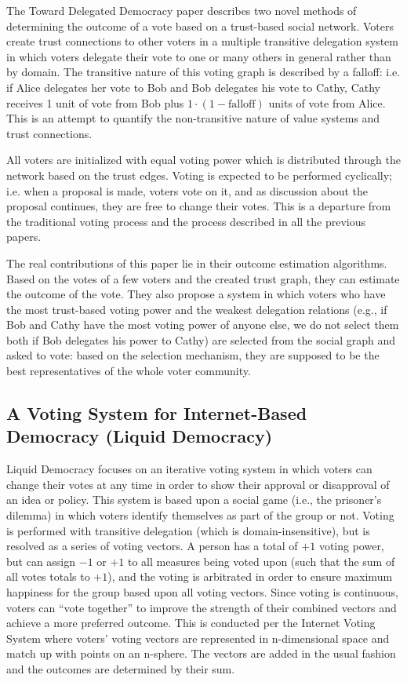 \documentclass[a4paper]{acm_proc_article-sp}
\begin{document}
The Toward Delegated Democracy paper describes two novel methods of determining the outcome of a vote based on a trust-based
social network.  Voters create trust connections to other voters in a multiple transitive delegation system in which voters
delegate their vote to one or many others in general rather than by domain.  The transitive nature of this voting graph is
described by a falloff: i.e. if Alice delegates her vote to Bob and Bob delegates his vote to Cathy, Cathy receives 1 unit of
vote from Bob plus $1 \cdot (1-\mathrm{falloff})$ units of vote from Alice.  This is an attempt to quantify the non-transitive
nature of value systems and trust connections.

All voters are initialized with equal voting power which is distributed through the network based on the trust edges.  Voting
is expected to be performed cyclically; i.e. when a proposal is made, voters vote on it, and as discussion about the proposal
continues, they are free to change their votes.  This is a departure from the traditional voting process and the process
described in all the previous papers.

The real contributions of this paper lie in their outcome estimation algorithms.  Based on the votes of a few voters and the
created trust graph, they can estimate the outcome of the vote.  They also propose a system in which voters who have the most
trust-based voting power and the weakest delegation relations (e.g., if Bob and Cathy have the most voting power of anyone else,
we do not select them both if Bob delegates his power to Cathy) are selected from the social graph and asked to vote: based on
the selection mechanism, they are supposed to be the best representatives of the whole voter community.

\subsection{A Voting System for Internet-Based Democracy (Liquid Democracy)}

Liquid Democracy focuses on an iterative voting system in which voters can change their votes at any time in order to show
their approval or disapproval of an idea or policy.  This system is based upon a social game (i.e., the prisoner's dilemma)
in which voters identify themselves as part of the group or not.  Voting is performed with transitive delegation (which is
domain-insensitive), but is resolved as a series of voting vectors.  A person has a total of $+1$ voting power, but can
assign $-1$ or $+1$ to all measures being voted upon (such that the sum of all votes totals to $+1$), and the voting is
arbitrated in order to ensure maximum happiness for the group based upon all voting vectors.  Since voting is continuous,
voters can ``vote together'' to improve the strength of their combined vectors and achieve a more preferred outcome.  This
is conducted per the Internet Voting System where voters' voting vectors are represented in n-dimensional space and match up
with points on an n-sphere.  The vectors are added in the usual fashion and the outcomes are determined by their sum.
\end{document}
